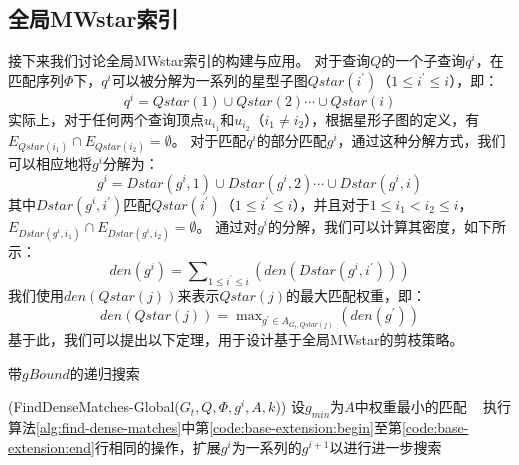 \subsection{全局MWstar索引}
\label{mwstar:global}
接下来我们讨论全局MWstar索引的构建与应用。
对于查询$Q$的一个子查询$q^i$，在匹配序列$\Phi$下，$q^i$可以被分解为一系列的星型子图$Qstar(i^\prime)$（$1 \leq i^\prime \leq i$），即：
\begin{equation} \label{equation:qstar-decompose}
    q^i = Qstar(1)\cup Qstar(2) \cdots \cup Qstar(i)
\end{equation}
实际上，对于任何两个查询顶点$u_{i_1}$和$u_{i_2}$（$i_1 \neq i_2$），根据星形子图的定义，有$E_{Qstar(i_1)} \cap E_{Qstar(i_2)} = \emptyset$。
对于匹配$q^i$的部分匹配$g^i$，通过这种分解方式，我们可以相应地将$g^i$分解为：
\begin{equation} \label{equation:dstar-decompose}
    g^i = Dstar(g^i, 1)\cup Dstar(g^i, 2) \cdots \cup Dstar(g^i, i)
\end{equation}
其中$Dstar(g^i, i^\prime)$匹配$Qstar(i^\prime)$（$1 \leq i^\prime \leq i$），并且对于$1 \leq i_1 < i_2 \leq i$，$E_{Dstar(g^i, i_1)} \cap E_{Dstar(g^i, i_2)} = \emptyset$。
通过对$g^i$的分解，我们可以计算其密度，如下所示：
\begin{equation}\label{equation:dense-dstar}
    den(g^i) = \sum\nolimits_{1\leq i^\prime\leq i} \left(den(Dstar(g^i,i^\prime))\right)
\end{equation}
我们使用$den(Qstar(j))$来表示$Qstar(j)$的最大匹配权重，即：
\begin{equation}\label{equation:dense-dstar}
	den(Qstar(j)) = \max\nolimits_{g^\prime \in A_{G_t, Qstar(j)}} \left(den(g^\prime)\right)
\end{equation}
基于此，我们可以提出以下定理，用于设计基于全局MWstar的剪枝策略。

\begin{algorithm}[h!]
    \small
    \caption{带$gBound$的递归搜索}
    \label{alg:find-dense-matches-gBound}
    \iFunc(FindDenseMatches-Global{(}$G_t, Q, \Phi, g^i, A, k${)})
    {
    设$g_{min}$为$A$中权重最小的匹配 \
    执行算法\ref{alg:find-dense-matches}中第\ref{code:base-extension:begin}至第\ref{code:base-extension:end}行相同的操作，扩展$g^i$为一系列的$g^{i+1}$以进行进一步搜索 \\
    \Return
    }
\end{algorithm}


